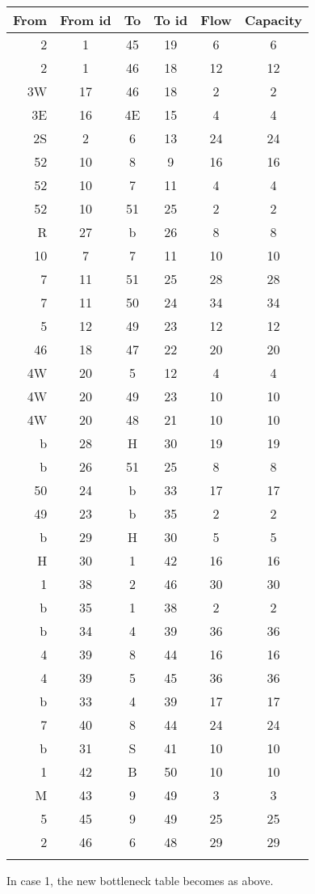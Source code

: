 \documentclass{tufte-handout}
\begin{document}
\begin{tabular}{rccccc}\toprule
From&From id&To&To id&Flow&Capacity\\\midrule
2&1&45&19&6&6\\
2&1&46&18&12&12\\
3W&17&46&18&2&2\\
3E&16&4E&15&4&4\\
2S&2&6&13&24&24\\
52&10&8&9&16&16\\
52&10&7&11&4&4\\
52&10&51&25&2&2\\
R&27&b&26&8&8\\
10&7&7&11&10&10\\
7&11&51&25&28&28\\
7&11&50&24&34&34\\
5&12&49&23&12&12\\
46&18&47&22&20&20\\
4W&20&5&12&4&4\\
4W&20&49&23&10&10\\
4W&20&48&21&10&10\\
b&28&H&30&19&19\\
b&26&51&25&8&8\\
50&24&b&33&17&17\\
49&23&b&35&2&2\\
b&29&H&30&5&5\\
H&30&1&42&16&16\\
1&38&2&46&30&30\\
b&35&1&38&2&2\\
b&34&4&39&36&36\\
4&39&8&44&16&16\\
4&39&5&45&36&36\\
b&33&4&39&17&17\\
7&40&8&44&24&24\\
b&31&S&41&10&10\\
1&42&B&50&10&10\\
M&43&9&49&3&3\\
5&45&9&49&25&25\\
2&46&6&48&29&29\\
 \\\bottomrule
  \end{tabular}
\bigskip

  In case 1, the new bottleneck table becomes as above.
\end{document}
